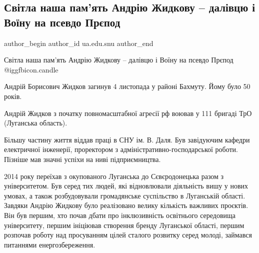  
 
 
 
 
 
\subsection{Світла наша пам’ять Андрію Жидкову – далівцю і Воїну на псевдо Прєпод}
\label{sec:04_11_2022.fb.ua.edu.snu.1.andrij_zhidkov}
 
\ifcmt
 author_begin
   author_id ua.edu.snu
 author_end
\fi

Світла наша пам’ять Андрію Жидкову – далівцю і Воїну на псевдо Прєпод  @igg{fbicon.candle} 

Андрій Борисович Жидков загинув 4 листопада у районі  Бахмуту. Йому було 50 років.

Андрій Жидков з початку повномасштабної агресії рф воював у 111 бригаді ТрО (Луганська область). 

Більшу частину життя віддав праці в СНУ ім. В. Даля. Був завідуючим кафедри
електричної інженерії, проректором з адміністративно-господарської роботи.
Пізніше мав значні успіхи на ниві підприємництва. 


2014 року переїхав з окупованого Луганська до Сєвєродонецька разом з
університетом. Був серед тих людей, які відновлювали діяльність вишу у нових
умовах, а також розбудовували громадянське суспільство в Луганській області.
Завдяки Андрію Жидкову було реалізовано велику кількість важливих проєктів. Він
був першим, хто почав дбати про інклюзивність освітнього середовища
університету, першим ініціював створення бренду Луганської області, першим
розпочав роботу над просуванням цілей сталого розвитку серед молоді, займався
питаннями енергозбереження.


